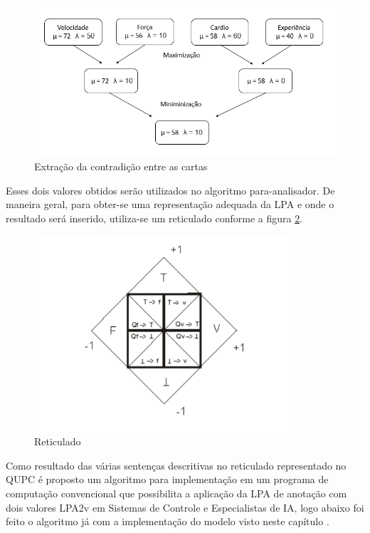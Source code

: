 \begin{figure}[htb]
	\caption{
		\label{fig:valores_2} 
		Extração da contradição entre as cartas
	}
	\begin{center}
		\includegraphics[scale=0.7]{imagens/valores_2.png}
	\end{center}
\end{figure}

Esses dois valores obtidos serão utilizados no algoritmo para-analisador. De maneira geral, para obter-se uma representação adequada da LPA e onde o resultado será inserido, utiliza-se um reticulado conforme a figura \ref{fig:reticulado}.	

\begin{figure}[htb]
	\caption{
		\label{fig:reticulado} 
		Reticulado
	}
	\begin{center}
		\includegraphics[scale=0.9]{imagens/reticulado.png}
	\end{center}
\end{figure}

Como resultado das várias sentenças descritivas no reticulado representado no QUPC é proposto um algoritmo para implementação em um programa de computação convencional que possibilita a aplicação da LPA de anotação com dois valores LPA2v em Sistemas de Controle e Especialistas de IA, logo abaixo foi feito o algoritmo já com a implementação do modelo visto neste capítulo \cite{metodos-lpa-2006}.



